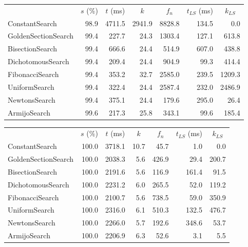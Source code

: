 \documentclass[a4paper,english,titlepage,12pt]{article}
\begin{document}
\begin{center}
\label{tab:performance_results_MSS_HBM}
\begin{tabular}{|l|r|r|r|r|r|r|}
\hline
\rowcolor{gray!25}
\multicolumn{1}{|c|}{Line Search Name} & \multicolumn{1}{c|}{$s$ (\%)} & \multicolumn{1}{c|}{$t$ (ms)} & \multicolumn{1}{c|}{$k$} & \multicolumn{1}{c|}{$f_n$} & \multicolumn{1}{c|}{$t_{LS}$ (ms)} & \multicolumn{1}{c|}{$k_{LS}$} \\
ConstantSearch & 98.9 & 4711.5 & 2941.9 & 8828.8 & 134.5 & 0.0 \\
GoldenSectionSearch & 99.4 & 227.7 & 24.3 & 1303.4 & 127.1 & 613.8 \\
BisectionSearch & 99.4 & 666.6 & 24.4 & 514.9 & 607.0 & 438.8 \\
DichotomousSearch & 99.4 & 209.4 & 24.4 & 904.9 & 99.3 & 414.4 \\
FibonacciSearch & 99.4 & 353.2 & 32.7 & 2585.0 & 239.5 & 1209.3 \\
UniformSearch & 99.4 & 322.4 & 24.4 & 2587.4 & 232.0 & 2486.9 \\
NewtonsSearch & 99.4 & 375.1 & 24.4 & 179.6 & 295.0 & 26.4 \\
ArmijoSearch & 99.6 & 217.3 & 25.8 & 343.1 & 99.6 & 185.4 \\
\hline
\end{tabular}
\end{center}


\begin{center}
\label{tab:performance_results_NE_NM}
\begin{tabular}{|l|r|r|r|r|r|r|}
\hline
\rowcolor{gray!25}
\multicolumn{1}{|c|}{Line Search Name} & \multicolumn{1}{c|}{$s$ (\%)} & \multicolumn{1}{c|}{$t$ (ms)} & \multicolumn{1}{c|}{$k$} & \multicolumn{1}{c|}{$f_n$} & \multicolumn{1}{c|}{$t_{LS}$ (ms)} & \multicolumn{1}{c|}{$k_{LS}$} \\
ConstantSearch & 100.0 & 3718.1 & 10.7 & 45.7 & 1.0 & 0.0 \\
GoldenSectionSearch & 100.0 & 2038.3 & 5.6 & 426.9 & 29.4 & 200.7 \\
BisectionSearch & 100.0 & 2191.6 & 5.6 & 116.9 & 161.4 & 91.5 \\
DichotomousSearch & 100.0 & 2231.2 & 6.0 & 265.5 & 52.0 & 119.2 \\
FibonacciSearch & 100.0 & 2100.7 & 5.6 & 738.5 & 59.0 & 350.9 \\
UniformSearch & 100.0 & 2316.0 & 6.1 & 510.3 & 132.5 & 476.7 \\
NewtonsSearch & 100.0 & 2266.0 & 5.7 & 192.6 & 348.6 & 53.7 \\
ArmijoSearch & 100.0 & 2206.9 & 6.3 & 52.6 & 3.1 & 5.5 \\
\hline
\end{tabular}
\end{center}
\end{document}

